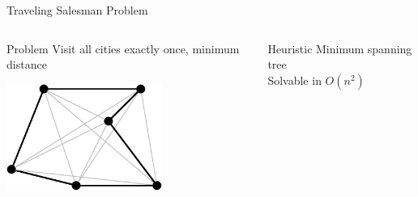 \documentclass[14pt]{beamer}
\begin{document}
\begin{frame}{Traveling Salesman Problem}
\begin{columns}
\begin{column}{2in}
\begin{block}{Problem}
Visit all cities exactly once, minimum distance
\end{block}
\begin{center}
\includegraphics[width=2in]{tsp.pdf}
\end{center}
\end{column}
\pause
\begin{column}{2in}
\begin{block}{Heuristic}
Minimum spanning tree \\
Solvable in $O(n^2)$
\end{block}
\begin{center}
%
\end{center}
\end{column}
\end{columns}
\end{frame}
\end{document}
